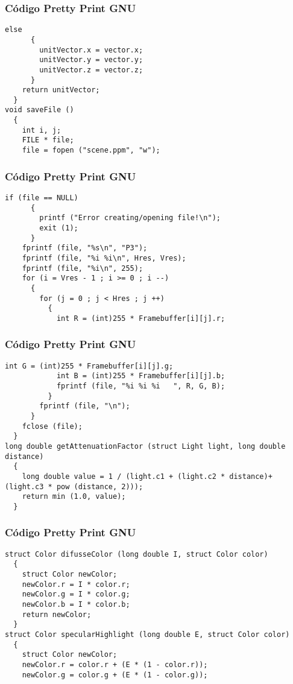 \documentclass{beamer}
\begin{document}
\begin{frame}[fragile]
\frametitle{C\'odigo Pretty Print GNU}
\begin{lstlisting}[style=CStyle]
    else
      {
        unitVector.x = vector.x;
        unitVector.y = vector.y;
        unitVector.z = vector.z;
      }
    return unitVector;
  }
void saveFile ()
  {
    int i, j;
    FILE * file;
    file = fopen ("scene.ppm", "w");
\end{lstlisting}
\end{frame}
\begin{frame}[fragile]
\frametitle{C\'odigo Pretty Print GNU}
\begin{lstlisting}[style=CStyle]
    if (file == NULL)
      {
        printf ("Error creating/opening file!\n");
        exit (1);
      }
    fprintf (file, "%s\n", "P3");
    fprintf (file, "%i %i\n", Hres, Vres);
    fprintf (file, "%i\n", 255);
    for (i = Vres - 1 ; i >= 0 ; i --)
      {
        for (j = 0 ; j < Hres ; j ++)
          {
            int R = (int)255 * Framebuffer[i][j].r;
\end{lstlisting}
\end{frame}
\begin{frame}[fragile]
\frametitle{C\'odigo Pretty Print GNU}
\begin{lstlisting}[style=CStyle]
            int G = (int)255 * Framebuffer[i][j].g;
            int B = (int)255 * Framebuffer[i][j].b;
            fprintf (file, "%i %i %i   ", R, G, B);
          }
        fprintf (file, "\n");
      }
    fclose (file);
  }
long double getAttenuationFactor (struct Light light, long double distance)
  {
    long double value = 1 / (light.c1 + (light.c2 * distance)+ (light.c3 * pow (distance, 2)));
    return min (1.0, value);
  }
\end{lstlisting}
\end{frame}
\begin{frame}[fragile]
\frametitle{C\'odigo Pretty Print GNU}
\begin{lstlisting}[style=CStyle]
struct Color difusseColor (long double I, struct Color color)
  {
    struct Color newColor;
    newColor.r = I * color.r;
    newColor.g = I * color.g;
    newColor.b = I * color.b;
    return newColor;
  }
struct Color specularHighlight (long double E, struct Color color)
  {
    struct Color newColor;
    newColor.r = color.r + (E * (1 - color.r));
    newColor.g = color.g + (E * (1 - color.g));
\end{lstlisting}
\end{frame}
\end{document}
